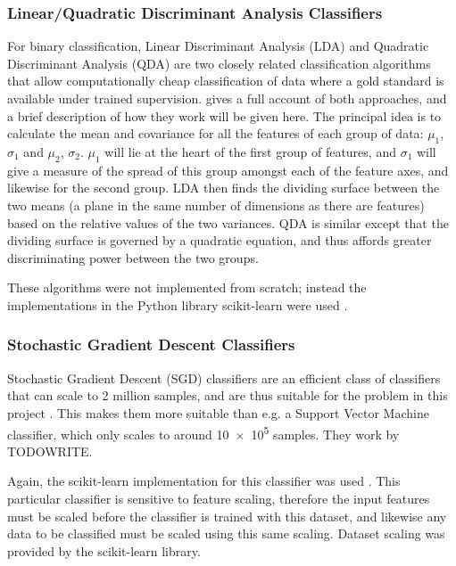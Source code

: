 \documentclass[pdftex,12pt,a4paper]{report}
\begin{document}

\subsubsection{Linear/Quadratic Discriminant Analysis Classifiers}

For binary classification, Linear Discriminant Analysis (LDA) and Quadratic Discriminant Analysis
(QDA) are two closely related classification algorithms that allow computationally cheap
classification of data where a gold standard is available under trained supervision.
\textcite{mclachlan2004discriminant} gives a full account of both approaches, and a brief description of how they
work will be given here. The principal idea is to calculate the mean and covariance for all the
features of each group of data: $\mu_1$, $\sigma_1$ and $\mu_2$, $\sigma_2$. $\mu_1$ will lie at the
heart of the first group of features, and $\sigma_1$ will give a measure of the spread of this group
amongst each of the feature axes, and likewise for the second group. LDA then finds the dividing
surface between the two means (a plane in the same number of dimensions as there are features) based
on the relative values of the two variances. QDA is similar except that the dividing surface is
governed by a quadratic equation, and thus affords greater discriminating power between the two
groups.

These algorithms were not implemented from scratch; instead the implementations in the Python
library scikit-learn were used \parencite{scikitLearn2011}.

\subsubsection{Stochastic Gradient Descent Classifiers}
Stochastic Gradient Descent (SGD) classifiers are an efficient class of classifiers that can scale
to 2 million samples, and are thus suitable for the problem in this project
\parencite{singer07pegasos}. This makes them more suitable than e.g. a Support Vector Machine
classifier, which only scales to around \SI{10e5}{} samples. They work by TODOWRITE.

Again, the scikit-learn implementation for this classifier was used \parencite{scikitLearn2011}.
This particular classifier is sensitive to feature scaling, therefore the input features must be
scaled before the classifier is trained with this dataset, and likewise any data to be classified
must be scaled using this same scaling. Dataset scaling was provided by the scikit-learn library.
\end{document}
